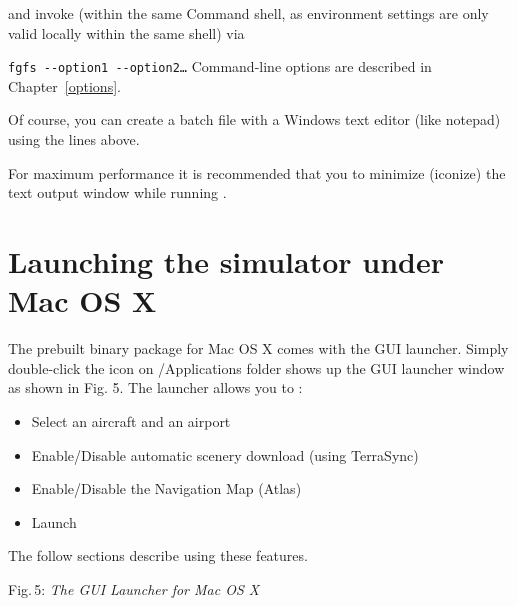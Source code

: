 \noindent
 and invoke \FlightGear{} (within the same Command shell, as environment
 settings are only valid locally within the same shell) via
\medskip

\texttt{fgfs -$ $-option1 -$ $-option2\dots}
\medskip
Command-line options are described in Chapter~\ref{options}.

Of course, you can create a batch file with a Windows text editor (like notepad)
using the lines above.

For maximum performance it is recommended that you to minimize (iconize) the
text output window while running \FlightGear{}.

\section{Launching the simulator under Mac OS X}
The prebuilt binary package for Mac OS X comes with the GUI launcher. Simply double-click the \FlightGear{} icon on /Applications folder shows up the GUI launcher window as shown in Fig. 5. The launcher allows you to :

\begin{itemize}
\item Select an aircraft and an airport
\item Enable/Disable automatic scenery download (using TerraSync)
\item Enable/Disable the Navigation Map (Atlas)
\item Launch \FlightGear{}
\end{itemize}

The follow sections describe using these features.

\smallskip

 \centerline{}
\smallskip
\noindent
Fig.\,5: \textit{The GUI Launcher for Mac OS X} \label{fig:maclauncher}

